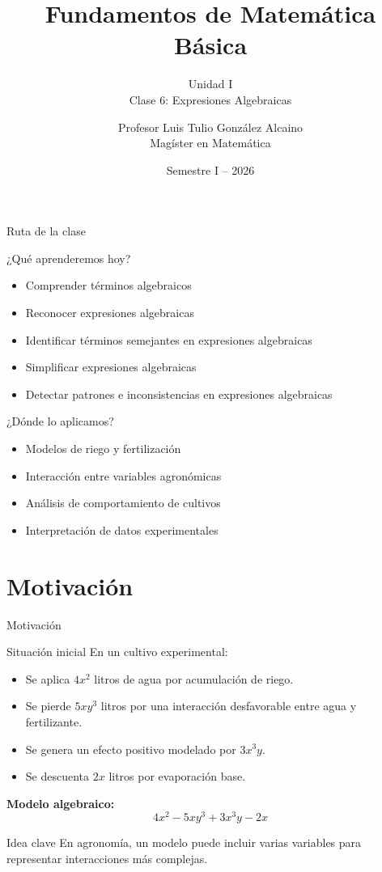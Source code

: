 \documentclass[handout,aspectratio=169,12pt]{beamer}
\title[Fundamentos de Matemática Básica]{Fundamentos de Matemática Básica}
\subtitle{Unidad I \\ Clase 6: Expresiones Algebraicas}
\author{Profesor Luis Tulio González Alcaino \\ \small Magíster en Matemática}
\institute{Universidad Santo Tomás \\ Departamento Ciencias Básicas -- Talca}
\date{Semestre I -- 2026}
\newcommand{\IdeaClave}[1]{
	\begin{alertblock}{Idea clave}
		#1
	\end{alertblock}
}
\begin{document}
	
	\begin{frame}
		\titlepage
	\end{frame}
	
	\begin{frame}{Ruta de la clase}
		\begin{block}{¿Qué aprenderemos hoy?}
			\begin{itemize}[<+->]
				\item Comprender términos algebraicos
				\item Reconocer expresiones algebraicas
				\item Identificar términos semejantes en expresiones algebraicas
				\item Simplificar expresiones algebraicas
				\item Detectar patrones e inconsistencias en expresiones algebraicas
			\end{itemize}
		\end{block}
		
		\pause
		
		\begin{exampleblock}{¿Dónde lo aplicamos?}
			\begin{itemize}[<+->]
				\item Modelos de riego y fertilización
				\item Interacción entre variables agronómicas
				\item Análisis de comportamiento de cultivos
				\item Interpretación de datos experimentales
			\end{itemize}
		\end{exampleblock}
	\end{frame}
	
	\section{Motivación}
	\begin{frame}{Motivación}
		\begin{block}{Situación inicial}
			En un cultivo experimental:
			\begin{itemize}
				\item Se aplica \(4x^2\) litros de agua por acumulación de riego.
				\pause
				\item Se pierde \(5xy^3\) litros por una interacción desfavorable entre agua y fertilizante.
				\pause
				\item Se genera un efecto positivo modelado por \(3x^3y\).
				\pause
				\item Se descuenta \(2x\) litros por evaporación base.
			\end{itemize}
		\end{block}
		
		\pause
		\textbf{Modelo algebraico:}
		\[
		4x^2 - 5xy^3 + 3x^3y - 2x
		\]
		
		\pause
		\IdeaClave{En agronomía, un modelo puede incluir varias variables para representar interacciones más complejas.}
	\end{frame}
	
\end{document}
